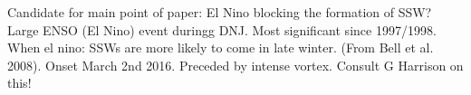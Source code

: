 Candidate for main point of paper: El Nino blocking the formation of SSW? 
Large ENSO (El Nino) event duringg DNJ. Most significant since 1997/1998.
When el nino: SSWs are more likely to come in late winter. (From Bell et al. 2008). Onset March 2nd 2016. Preceded by intense vortex. 
Consult G Harrison on this!
